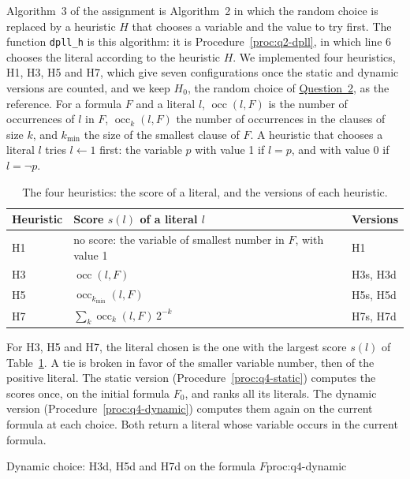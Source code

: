 Algorithm~3 of the assignment is Algorithm~2 in which the random choice is replaced by a heuristic $H$ that chooses a variable and the value to try first. The function \texttt{dpll\_h} is this algorithm: it is Procedure~\ref{proc:q2-dpll}, in which line 6 chooses the literal according to the heuristic $H$. We implemented four heuristics, H1, H3, H5 and H7, which give seven configurations once the static and dynamic versions are counted, and we keep $H_0$, the random choice of \hyperref[sec:q2]{Question~2}, as the reference. For a formula $F$ and a literal $l$, $\operatorname{occ}(l,F)$ is the number of occurrences of $l$ in $F$, $\operatorname{occ}_k(l,F)$ the number of occurrences in the clauses of size $k$, and $k_{\min}$ the size of the smallest clause of $F$. A heuristic that chooses a literal $l$ tries $l\leftarrow1$ first: the variable $p$ with value 1 if $l=p$, and with value 0 if $l=\neg p$.
\begin{table}[H]
\centering
\begin{tabular}{@{}lll@{}}
\toprule
Heuristic & Score $s(l)$ of a literal $l$ & Versions\\
\midrule
H1 & no score: the variable of smallest number in $F$, with value 1 & H1\\
H3 & $\operatorname{occ}(l,F)$ & H3s, H3d\\
H5 & $\operatorname{occ}_{k_{\min}}(l,F)$ & H5s, H5d\\
H7 & $\sum_{k}\operatorname{occ}_k(l,F)\,2^{-k}$ & H7s, H7d\\
\bottomrule
\end{tabular}
\caption{The four heuristics: the score of a literal, and the versions of each heuristic.}
\label{tab:q4-heuristics}
\end{table}
For H3, H5 and H7, the literal chosen is the one with the largest score $s(l)$ of Table~\ref{tab:q4-heuristics}. A tie is broken in favor of the smaller variable number, then of the positive literal. The static version (Procedure~\ref{proc:q4-static}) computes the scores once, on the initial formula $F_0$, and ranks all its literals. The dynamic version (Procedure~\ref{proc:q4-dynamic}) computes them again on the current formula at each choice. Both return a literal whose variable occurs in the current formula.

\begin{pseudo}{Dynamic choice: H3d, H5d and H7d on the formula $F$}{proc:q4-dynamic}
\end{pseudo}

